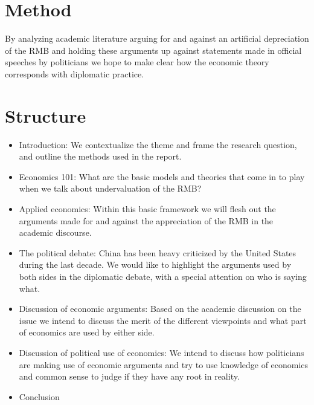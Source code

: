 \documentclass[11pt]{article}
\begin{document}
\section{Method}

By analyzing academic literature arguing for and against an artificial 
depreciation of the RMB and holding these arguments up against 
statements made in official speeches by politicians we hope to make 
clear how the economic theory corresponds with diplomatic practice.

\section{Structure}

\begin{itemize}
\item{Introduction: We contextualize the theme and frame the research 
question, and outline the methods used in the report.}

\item{Economics 101: What are the basic models and theories that come in 
to play when we talk about undervaluation of the RMB?}

\item{Applied economics: Within this basic framework we will flesh out 
the arguments made for and against the appreciation of the RMB in the 
academic discourse.}

\item{The political debate: China has been heavy criticized by the 
United States during the last decade. We would like to highlight the 
arguments used by both sides in the diplomatic debate, with a special 
attention on who is saying what.}

\item{Discussion of economic arguments: Based on the academic discussion 
on the issue we intend to discuss the merit of the different viewpoints 
and what part of economics are used by either side.}

%
\item{Discussion of political use of economics: We intend to discuss how 
politicians are making use of economic arguments and try to use 
knowledge of economics and common sense to judge if they have any root 
in reality.}

\item{Conclusion}

\end{itemize}

\nocite{*}


\end{document}
